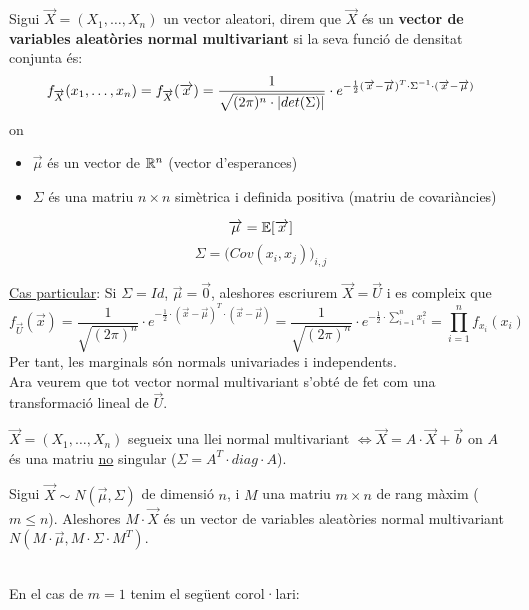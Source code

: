 \begin{defi}
  Sigui $\overrightarrow{X}=(X_{1},\ldots,X_{n})$ un vector aleatori, direm que $\overrightarrow{X}$ 
  és un \textbf{vector de variables aleatòries normal multivariant} si la seva funció de densitat conjunta és:
  \[
    f_{\overrightarrow{X}}(x_{1},\ldots,x_{n}) = f_{\overrightarrow{X}}(\overrightarrow{x}) = \frac{1}{\sqrt{(2\pi)^{n}\cdot \left\vert det(\Sigma) \right\vert}}\cdot e^{-\frac{1}{2}(\overrightarrow{x}-\overrightarrow{\mu})^{T}\cdot \Sigma^{-1} \cdot (\overrightarrow{x}-\overrightarrow{\mu})}
  \]
  on
  \begin{itemize}
      \item  $\overrightarrow{\mu}$ és un vector de $\mathbb{R}^{n}$ (vector d'esperances)
      \item $\Sigma$ és una matriu $n\times n$ simètrica i definida positiva (matriu de covariàncies)
  \end{itemize}
  \[
    \overrightarrow{\mu} = \mathbb{E}[\overrightarrow{x}]
  \]
  \[
    \Sigma = \Big( Cov(x_{i},x_{j})\Big)_{i,j}
  \]
\end{defi}

\underline{Cas particular}: Si $\Sigma = Id$, $\overrightarrow{\mu} = \overrightarrow{0}$, aleshores 
escriurem $\overrightarrow{X}=\overrightarrow{U}$ i es compleix que 
\[
f_{\overrightarrow{U}}(\overrightarrow{x}) = \frac{1}{\sqrt{(2\pi)^{n}}}\cdot e^{-\frac{1}{2}\cdot(\overrightarrow{x}-\overrightarrow{\mu})^{T}\cdot  (\overrightarrow{x}-\overrightarrow{\mu})} = \frac{1}{\sqrt{(2\pi)^{n}}}\cdot e^{-\frac{1}{2}\cdot\sum\limits_{i=1}^{n}x_{i}^{2}} = \prod_{i=1}^{n} f_{x_{i}}(x_{i})
\]
Per tant, les marginals són normals univariades i independents. \\

Ara veurem que tot vector normal multivariant s'obté de fet com una transformació lineal de $\overrightarrow{U}$.

\begin{thm}
  $\overrightarrow{X}=(X_{1},\ldots,X_{n})$ segueix una llei normal multivariant $\iff \overrightarrow{X} = 
  A\cdot\overrightarrow{X} + \overrightarrow{b}$ on $A$ és una matriu \underline{no} singular ($\Sigma = A^{T}\cdot diag \cdot A$).
\end{thm}

\begin{thm}
  Sigui $\overrightarrow{X}\sim N(\overrightarrow{\mu}, \Sigma)$ de dimensió $n$, i $M$ una matriu 
  $m\times n$ de rang màxim ($m\leq n$). Aleshores $M\cdot\overrightarrow{X}$ és un vector de variables 
  aleatòries normal multivariant $N(M\cdot\overrightarrow{\mu}, M\cdot\Sigma\cdot M^{T})$.
\end{thm}
\-\\
En el cas de $m = 1$ tenim el següent corol·lari:

